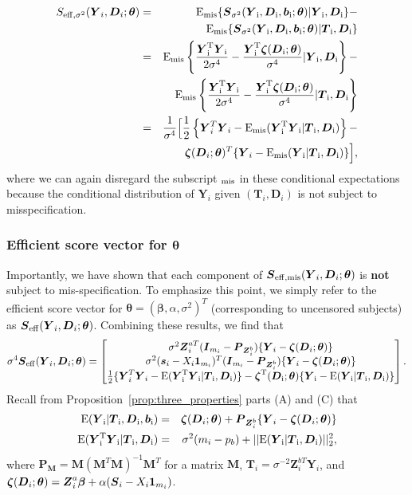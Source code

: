 \documentclass[12pt]{article}
\def\bse{\begin{eqnarray*}}
\def\ese{\end{eqnarray*}}
\def\be{\begin{eqnarray}}
\def\ee{\end{eqnarray}}
\def\bse{\begin{eqnarray*}}
\def\ese{\end{eqnarray*}}
\def\bS{{\mathbf S}}
\newcommand{\bzeta}{\mbox{\boldmath $\zeta$}}
\def\bbeta{{\boldsymbol{\beta}}}
\def\btheta{{\boldsymbol{\theta}}}
\def\bone{{\boldsymbol{1}}}
\def\bb{{\boldsymbol b}}
\def\bs{{\boldsymbol s}}
\def\bD{{\boldsymbol D}}
\def\bI{{\boldsymbol I}}
\def\bM{{\boldsymbol M}}
\def\bP{{\boldsymbol P}}
\def\bS{{\boldsymbol S}}
\def\bT{{\boldsymbol T}}
\def\bY{{\boldsymbol Y}}
\def\bZ{{\boldsymbol Z}}
\def\tilD{\bD}
\def\E{\rm E}
\begin{document}
\bse
S_{\rm{eff},\sigma^2}(\bY_i,\tilD_i;\btheta)&=&\E_{\rm{mis}}\{\bS_{\sigma^2}(\bY_i,\tilD_i,\bb_i;\btheta)|\bY_i,\tilD_i\}-\\
&&\E_{\rm{mis}}\{\bS_{\sigma^2}(\bY_i,\tilD_i,\bb_i;\btheta)|\bT_i,\tilD_i\}\\
&=&\E_{\rm{mis}}\left\{\frac{\bY_i^T\bY_i}{2\sigma^4}-\frac{\bY_i^T\bzeta(\tilD_i;\btheta)}{\sigma^4}|\bY_i,\tilD_i\right\}-\\
&&\E_{\rm{mis}}\left\{\frac{\bY_i^T\bY_i}{2\sigma^4}-\frac{\bY_i^T\bzeta(\tilD_i;\btheta)}{\sigma^4}|\bT_i,\tilD_i\right\}\\
&=&\frac{1}{\sigma^4}\Big[\frac{1}{2}\left\{\bY_i^T\bY_i-\E_{\rm{mis}}(\bY_i^T\bY_i|\bT_i,\tilD_i)\right\}-\\
&&\bzeta(\tilD_i;\btheta)^T\{\bY_i-\E_{\rm{mis}}(\bY_i|\bT_i,\tilD_i)\}\Big],
\ese
where we can again disregard the subscript $_{\rm{mis}}$ in these conditional expectations because the conditional distribution of $\bY_i$ given $(\bT_i,\tilD_i)$ is not subject to misspecification. 

\subsubsection{Efficient score vector for $\btheta$}
Importantly, we have shown that each component of $\bS_{\rm{eff, mis}}(\bY_i,\tilD_i;\btheta)$ is \textbf{not} subject to mis-specification. To emphasize this point, we simply refer to the efficient score vector for $\btheta=(\bbeta, \alpha, \sigma^2)^T$ (corresponding to uncensored subjects) as $\bS_{\rm{eff}}(\bY_i,\tilD_i;\btheta)$. Combining these results, we find that
\be
\label{eqn:app_uncens_eff_score_vec}
\sigma^4\bS_{\rm{eff}}(\bY_i,\tilD_i;\btheta)=\left[
\begin{matrix}
\sigma^2\bZ_i^{aT}(\bI_{m_i} - \bP_{\bZ_i^b})\{\bY_i-\bzeta(\tilD_i;\btheta)\} \\
\sigma^2(\bs_i-X_i\bone_{m_i})^T(\bI_{m_i} - \bP_{\bZ_i^b})\{\bY_i-\bzeta(\tilD_i;\btheta)\} \\
\frac{1}{2}\{\bY_i^T\bY_i-\E(\bY_i^T\bY_i|\bT_i,\tilD_i)\}-\bzeta^T(\tilD_i;\btheta)\{\bY_i-\E(\bY_i|\bT_i,\tilD_i)\}
\end{matrix}
\right].
\ee
Recall from Proposition~\ref{prop:three_properties} parts (A) and (C) that
\bse
\rm{E}(\bY_i|\bT_i,\tilD_i,\bb_i)&=&\bzeta(\tilD_i;\btheta)+\bP_{\bZ_i^b}\{\bY_i-\bzeta(\tilD_i;\btheta)\}\\
\rm{E}(\bY_i^T\bY_i|\bT_i,\tilD_i)&=&\sigma^2(m_i-p_b)+||\rm{E}(\bY_i|\bT_i,\tilD_i)||^2_2,
\ese
where $\bP_{\bM} = \bM(\bM^T\bM)^{-1}\bM^T$ for a matrix $\bM$, $\bT_i = \sigma^{-2}\bZ_i^{bT}\bY_i$, and $\bzeta(\tilD_i;\btheta)=\bZ_i^a\bbeta  + \alpha(\bS_i - X_i\bone_{m_i})$.
\end{document}
